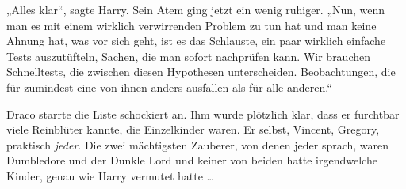 „Alles klar“, sagte Harry. Sein Atem ging jetzt ein wenig ruhiger.
„Nun, wenn man es mit einem wirklich verwirrenden Problem zu tun hat und man keine Ahnung hat, was vor sich geht, ist es das Schlauste, ein paar wirklich einfache Tests auszutüfteln, Sachen, die man sofort nachprüfen kann. Wir brauchen Schnelltests, die zwischen diesen Hypothesen unterscheiden. Beobachtungen, die für zumindest eine von ihnen anders ausfallen als für alle anderen.“

Draco starrte die Liste schockiert an. Ihm wurde plötzlich klar, dass er furchtbar viele Reinblüter kannte, die Einzelkinder waren. Er selbst, Vincent, Gregory, praktisch \emph{jeder}. Die zwei mächtigsten Zauberer, von denen jeder sprach, waren Dumbledore und der Dunkle Lord und keiner von beiden hatte irgendwelche Kinder, genau wie Harry vermutet hatte …

